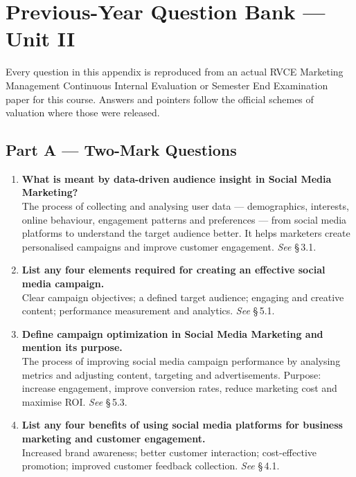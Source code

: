 \chapter{Previous-Year Question Bank --- Unit II}

Every question in this appendix is reproduced from an actual RVCE Marketing
Management Continuous Internal Evaluation or Semester End Examination paper for
this course. Answers and pointers follow the official schemes of valuation where
those were released.

\section*{Part A --- Two-Mark Questions}

\begin{enumerate}[leftmargin=2.2em,itemsep=1.1ex]

\item \textbf{What is meant by data-driven audience insight in Social Media
      Marketing?} \\
      The process of collecting and analysing user data --- demographics,
      interests, online behaviour, engagement patterns and preferences --- from
      social media platforms to understand the target audience better. It helps
      marketers create personalised campaigns and improve customer engagement.
      \hfill\emph{See} \S\,3.1.

\item \textbf{List any four elements required for creating an effective social
      media campaign.} \\
      Clear campaign objectives; a defined target audience; engaging and creative
      content; performance measurement and analytics. \hfill\emph{See} \S\,5.1.

\item \textbf{Define campaign optimization in Social Media Marketing and mention
      its purpose.} \\
      The process of improving social media campaign performance by analysing
      metrics and adjusting content, targeting and advertisements. Purpose:
      increase engagement, improve conversion rates, reduce marketing cost and
      maximise ROI. \hfill\emph{See} \S\,5.3.

\item \textbf{List any four benefits of using social media platforms for business
      marketing and customer engagement.} \\
      Increased brand awareness; better customer interaction; cost-effective
      promotion; improved customer feedback collection. \hfill\emph{See} \S\,4.1.


\end{enumerate}
